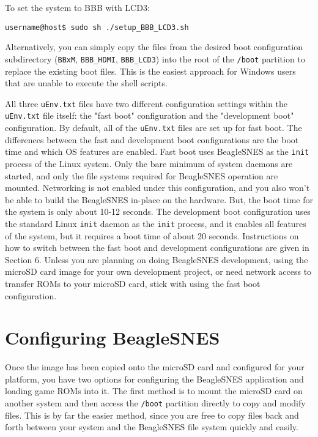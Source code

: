 To set the system to BBB with LCD3: 

\begin{commandBox}
\texttt{username@host\$  sudo sh ./setup\_BBB\_LCD3.sh}
\end{commandBox}

\begin{updateWarn}
Alternatively, you can simply copy the files from the desired boot configuration subdirectory (\texttt{BBxM}, \texttt{BBB\_HDMI}, \texttt{BBB\_LCD3}) into the root of the \texttt{/boot} partition to replace the existing boot files.  This is the easiest approach for Windows users that are unable to execute the shell scripts.
\end{updateWarn}

All three \texttt{uEnv.txt} files have two different configuration settings within the \texttt{uEnv.txt} file itself: the "fast boot" configuration and the "development boot" configuration.  By default, all of the \texttt{uEnv.txt} files are set up for fast boot.  The differences between the fast and development boot configurations are the boot time and which OS features are enabled.  Fast boot uses BeagleSNES as the \texttt{init} process of the Linux system.  Only the bare minimum of system daemons are started, and only the file systems required for BeagleSNES operation are mounted.  Networking is not enabled under this configuration, and you also won't be able to build the BeagleSNES in-place on the hardware.  But, the boot time for the system is only about 10-12 seconds.  The development boot configuration uses the standard Linux \texttt{init} daemon as the \texttt{init} process, and it enables all features of the system, but it requires a boot time of about 20 seconds.  Instructions on how to switch between the fast boot and development configurations are given in Section 6.  Unless you are planning on doing BeagleSNES development, using the microSD card image for your own development project, or need network access to transfer ROMs to your microSD card, stick with using the fast boot configuration. 

\section{Configuring BeagleSNES}

Once the image has been copied onto the microSD card and configured for your platform, you have two options for configuring the BeagleSNES application and loading game ROMs into it. The first method is to mount the microSD card on another system and then access the \texttt{/boot} partition directly to copy and modify files. This is by far the easier method, since you are free to copy files back and forth between your system and the BeagleSNES file system quickly and easily. 

